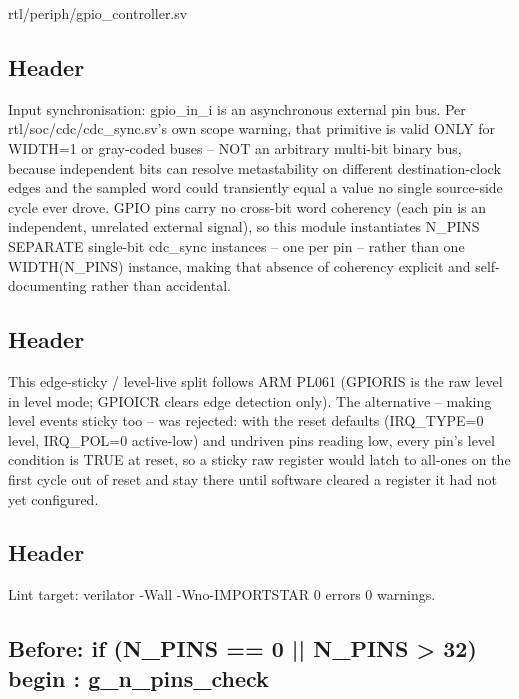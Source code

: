 \begin{relocated}{rtl/periph/gpio_controller.sv}

\subsection*{Header}

\begin{textblock}
Input synchronisation: gpio_in_i is an asynchronous external pin bus. Per
rtl/soc/cdc/cdc_sync.sv's own scope warning, that primitive is valid
ONLY for WIDTH=1 or gray-coded buses -- NOT an arbitrary multi-bit binary
bus, because independent bits can resolve metastability on different
destination-clock edges and the sampled word could transiently equal a
value no single source-side cycle ever drove. GPIO pins carry no cross-bit
word coherency (each pin is an independent, unrelated external signal), so
this module instantiates N_PINS SEPARATE single-bit cdc_sync instances
-- one per pin -- rather than one WIDTH(N_PINS) instance, making that
absence of coherency explicit and self-documenting rather than accidental.
\end{textblock}

\subsection*{Header}

\begin{textblock}
This edge-sticky / level-live split follows ARM PL061 (GPIORIS is the raw
level in level mode; GPIOICR clears edge detection only). The alternative --
making level events sticky too -- was rejected: with the reset defaults
(IRQ_TYPE=0 level, IRQ_POL=0 active-low) and undriven pins reading low,
every pin's level condition is TRUE at reset, so a sticky raw register
would latch to all-ones on the first cycle out of reset and stay there
until software cleared a register it had not yet configured.
\end{textblock}

\subsection*{Header}

\begin{textblock}
Lint target: verilator -Wall -Wno-IMPORTSTAR 0 errors 0 warnings.
\end{textblock}

\subsection*{Before: if (N\_PINS == 0 || N\_PINS > 32) begin : g\_n\_pins\_check}


\end{relocated}
